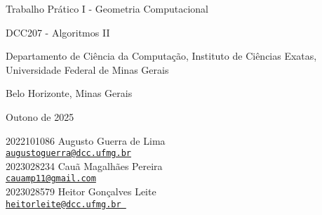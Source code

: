 \documentclass{article}
\begin{document}
\begin{center}
    {
    \Large
    Trabalho Prático I - Geometria Computacional

    DCC207 - Algoritmos II
    
    }

    Departamento de Ciência da Computação, Instituto de Ciências Exatas, Universidade Federal de Minas Gerais

    Belo Horizonte, Minas Gerais

    Outono de 2025
\end{center}

\begin{flushright}
2022101086  Augusto Guerra de Lima\\
\href{mailto:augustoguerra@dcc.ufmg.br}{\texttt{augustoguerra@dcc.ufmg.br}}\\
2023028234  Cauã Magalhães Pereira\\
\href{mailto:cauamp11@gmail.com}{\texttt{cauamp11@gmail.com}} \\
2023028579  Heitor Gonçalves Leite\\
\href{mailto:heitorleite@dcc.ufmg.br }{\texttt{heitorleite@dcc.ufmg.br }}
\end{flushright}
\end{document}
